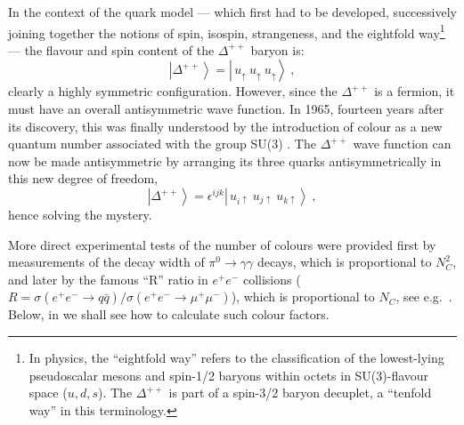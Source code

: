 In the context of the quark model --- which first
had to be developed, successively joining together the notions of 
spin, isospin, strangeness, and 
the eightfold way\footnote{In physics, the ``eightfold way''
refers to the classification of the lowest-lying pseudoscalar
mesons and 
%
spin-1/2 baryons within octets in SU(3)-flavour space ($u,d,s$). The
$\Delta^{++}$ is part of a spin-3/2 baryon decuplet, a ``tenfold way'' in this
terminology.} 
--- the flavour and spin content of the $\Delta^{++}$
baryon is: 
\begin{equation}
\left\vert \Delta^{++} \right> = \left\vert
\,u_\uparrow\ u_\uparrow\ u_\uparrow \right>~,
\end{equation} 
clearly a highly symmetric configuration. However, since 
the $\Delta^{++}$ is a fermion, it must have an overall
antisymmetric wave function. In 1965, fourteen years after its
discovery, this was finally understood by the introduction of colour
%
%
as a new quantum number associated with the group SU(3)
\cite{Greenberg:1964pe,Han:1965pf}. The $\Delta^{++}$ wave function can now be made
antisymmetric by arranging its three quarks antisymmetrically 
in this new degree of freedom, 
\begin{equation}
\left\vert \Delta^{++} \right> = \epsilon^{ijk} \left\vert
\,u_{i\uparrow}\ u_{j\uparrow}\ u_{k\uparrow}\right>~,
\end{equation} 
hence solving the mystery.

More direct experimental tests of the number of colours were provided first by
measurements of the decay width of $\pi^0\to \gamma\gamma$ decays, which 
is proportional to $N_C^2$, 
and later by the famous ``R'' ratio in
$e^+e^-$ collisions ($R=\sigma(e^+e^-\to q\bar{q})/\sigma(e^+e^-\to
\mu^+\mu^-)$), which is proportional to $N_C$, see
e.g.~\cite{Dissertori:2003pj}. 
Below, in  we shall see how to
calculate such colour factors. 

